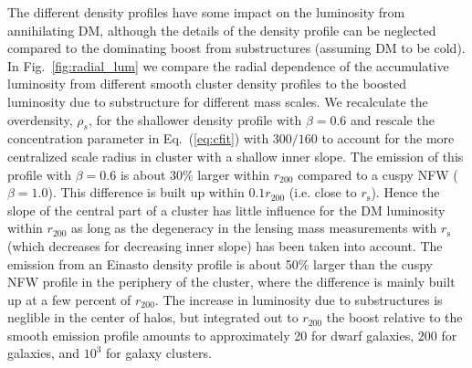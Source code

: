 \documentclass[10pt,aps,pra,reprint,amsmath,amsfonts,amssymb,showpacs,nofootinbib,floatfix]{revtex4-1}
\newcommand{\rmn}{\mathrm}
\newcommand{\s}{\rmn{s}}
\newcommand{\rhos}{\ensuremath{\rho_s}}
\newcommand{\rvir}{r_{200}}
\begin{document}
The different density profiles have some impact on the luminosity from
annihilating DM, although the details of the density profile can be
neglected compared to the dominating boost from substructures
(assuming DM to be cold). In Fig.~\ref{fig:radial_lum} we compare the
radial dependence of the accumulative luminosity from different smooth
cluster density profiles to the boosted luminosity due to substructure
for different mass scales. We recalculate the overdensity, $\rhos$,
for the shallower density profile with $\beta=0.6$ and rescale the
concentration parameter in Eq.~(\ref{eq:cfit}) with $300/160$
\cite{2011ApJ...728L..39N} to account for the more centralized scale
radius in cluster with a shallow inner slope. The emission of this
profile with $\beta=0.6$ is about 30\% larger within $\rvir$ compared
to a cuspy NFW ($\beta=1.0$).  This difference is built up within
$0.1\rvir$ (i.e. close to $r_\s$). Hence the slope of the central part
of a cluster has little influence for the DM luminosity within $\rvir$
as long as the degeneracy in the lensing mass measurements with $r_\s$
(which decreases for decreasing inner slope) has been taken into
account. The emission from an Einasto density profile is about 50\%
larger than the cuspy NFW profile in the periphery of the cluster,
where the difference is mainly built up at a few percent of
$\rvir$. The increase in luminosity due to substructures is neglible in
the center of halos, but integrated out to $\rvir$ the boost relative
to the smooth emission profile amounts to approximately 20 for dwarf
galaxies, $200$ for galaxies, and $10^3$ for galaxy clusters.
\end{document}
